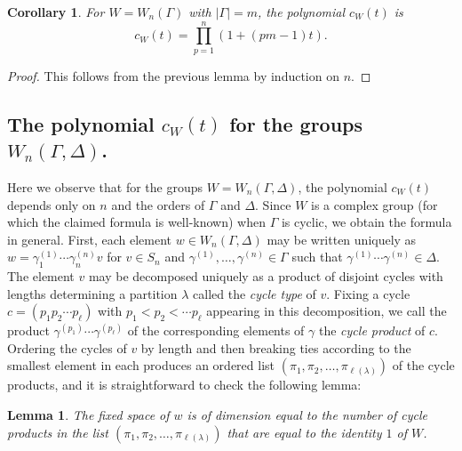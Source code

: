\documentclass[11pt, reqno]{amsart}
\numberwithin{equation}{section}
\theoremstyle{definition}
\theoremstyle{plain}
\newtheorem{corollary}[theorem]{Corollary}
\newtheorem{lemma}[theorem]{Lemma}
\begin{document}
\begin{corollary}
For $W=W_n(\Gamma)$ with $|\Gamma|=m$, the polynomial $c_W(t)$ is
$$c_W(t)=\prod_{p=1}^n (1+(pm-1) t).$$
\end{corollary}
\begin{proof}
This follows from the previous lemma by induction on $n$.
\end{proof}

\subsection{The polynomial $c_W(t)$ for the groups $W_n(\Gamma,\Delta)$.} Here we observe that for the groups $W=W_n(\Gamma,\Delta)$, the polynomial $c_W(t)$ depends only on $n$ and the orders of $\Gamma$ and $\Delta$. Since $W$ is a complex group (for which the claimed formula is well-known) when $\Gamma$ is cyclic, we obtain the formula in general. First, each element $w \in W_n(\Gamma,\Delta)$ may be written uniquely as $w=\gamma^{(1)}_1 \cdots \gamma^{(n)}_n v$ for $v \in S_n$ and $\gamma^{(1)},\dots,\gamma^{(n)} \in \Gamma$ such that $\gamma^{(1)} \cdots \gamma^{(n)} \in \Delta$. The element $v$ may be decomposed uniquely as a product of disjoint cycles with lengths determining a partition $\lambda$ called the \emph{cycle type} of $v$. Fixing a cycle $c=(p_1 p_2 \cdots p_\ell)$ with $p_1 < p_2 < \cdots p_\ell$ appearing in this decomposition, we call the product $\gamma^{(p_1)} \cdots \gamma^{(p_\ell)}$ of the corresponding elements of $\gamma$ the \emph{cycle product} of $c$. Ordering the cycles of $v$ by length and then breaking ties according to the smallest element in each produces an ordered list $(\pi_1,\pi_2, \dots, \pi_{\ell(\lambda)})$ of the cycle products, and it is straightforward to check the following lemma:
\begin{lemma} 
The fixed space of $w$ is of dimension equal to the number of cycle products in the list $(\pi_1,\pi_2,\dots,\pi_{\ell(\lambda)})$ that are equal to the identity $1$ of $W$.
\end{lemma}
\end{document}
